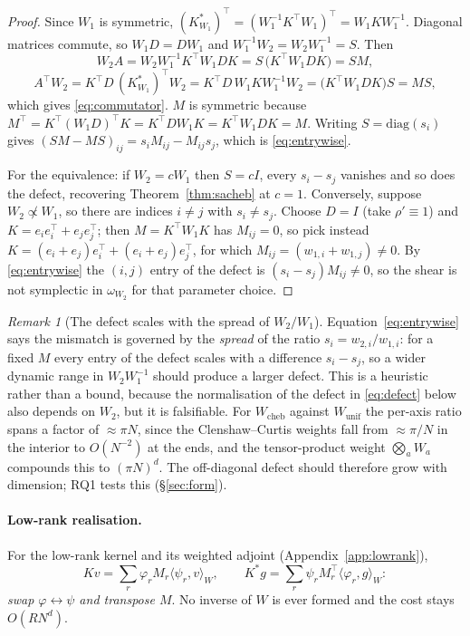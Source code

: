 \documentclass[11pt]{article}
\theoremstyle{definition}
\theoremstyle{remark}
\newtheorem{remark}[theorem]{Remark}
\newcommand{\iprod}[2]{\langle #1, #2 \rangle}
\newcommand{\Wc}{W_{\mathrm{cheb}}}
\newcommand{\Wu}{W_{\mathrm{unif}}}
\begin{document}
\begin{proof}
Since $W_1$ is symmetric, $(K^{*}_{W_1})^{\top}=(W_1^{-1}K^{\top}W_1)^{\top}
=W_1KW_1^{-1}$. Diagonal matrices commute, so $W_1D=DW_1$ and
$W_1^{-1}W_2=W_2W_1^{-1}=S$. Then
\[
W_2A = W_2W_1^{-1}K^{\top}W_1DK = S\,\big(K^{\top}W_1DK\big) = SM ,
\]
\[
A^{\top}W_2 = K^{\top}D\,(K^{*}_{W_1})^{\top}W_2
            = K^{\top}D\,W_1KW_1^{-1}W_2
            = \big(K^{\top}W_1DK\big)S = MS ,
\]
which gives \eqref{eq:commutator}. $M$ is symmetric because
$M^{\top}=K^{\top}(W_1D)^{\top}K=K^{\top}DW_1K=K^{\top}W_1DK=M$. Writing
$S=\mathrm{diag}(s_i)$ gives $(SM-MS)_{ij}=s_iM_{ij}-M_{ij}s_j$, which is
\eqref{eq:entrywise}.

For the equivalence: if $W_2=cW_1$ then $S=cI$, every $s_i-s_j$ vanishes and so does the defect, recovering Theorem~\ref{thm:sacheb} at $c=1$. Conversely,
suppose $W_2\not\propto W_1$, so there are indices $i\neq j$ with $s_i\neq s_j$.
Choose $D=I$ (take $\rho'\equiv1$) and $K=e_ie_i^{\top}+e_je_j^{\top}$; then
$M=K^{\top}W_1K$ has $M_{ij}=0$, so pick instead
$K=(e_i+e_j)e_i^{\top}+(e_i+e_j)e_j^{\top}$, for which
$M_{ij}=(w_{1,i}+w_{1,j})\neq0$. By \eqref{eq:entrywise} the $(i,j)$ entry of the
defect is $(s_i-s_j)M_{ij}\neq0$, so the shear is not symplectic in
$\omega_{W_2}$ for that parameter choice.
\end{proof}

\begin{remark}[The defect scales with the spread of $W_2/W_1$]
\label{rem:spread}
Equation~\eqref{eq:entrywise} says the mismatch is governed by the
\emph{spread} of the ratio $s_i=w_{2,i}/w_{1,i}$: for a fixed $M$ every entry of
the defect scales with a difference $s_i-s_j$, so a wider dynamic range in
$W_2W_1^{-1}$ should produce a larger defect. This is a heuristic rather than a
bound, because the normalisation of the defect in \eqref{eq:defect} below also
depends on $W_2$, but it is falsifiable. For $\Wc$ against $\Wu$ the per-axis
ratio spans a factor of $\approx\pi N$, since the Clenshaw--Curtis weights fall
from $\approx\pi/N$ in the interior to $O(N^{-2})$ at the ends, and the
tensor-product weight $\bigotimes_a W_a$ compounds this to $(\pi N)^d$. The
off-diagonal defect should therefore grow with dimension; RQ1 tests this
(\S\ref{sec:form}).
\end{remark}

\paragraph{Low-rank realisation.} For the low-rank kernel and its weighted
adjoint (Appendix~\ref{app:lowrank}),
\[
Kv=\sum_r\varphi_r M_r\iprod{\psi_r}{v}_W,
\qquad
K^{*}g=\sum_r\psi_r M_r^{\top}\iprod{\varphi_r}{g}_W :
\]
\emph{swap $\varphi\leftrightarrow\psi$ and transpose $M$}. No inverse of $W$ is
ever formed and the cost stays $O(RN^d)$.
\end{document}
